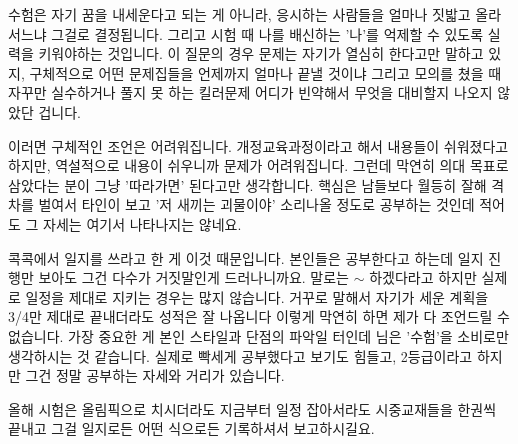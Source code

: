 수험은 자기 꿈을 내세운다고 되는 게 아니라, 응시하는 사람들을 얼마나 짓밟고 올라서느냐 그걸로 결정됩니다.
그리고 시험 때 나를 배신하는 '나'를 억제할 수 있도록 실력을 키워야하는 것입니다.
이 질문의 경우 문제는 자기가 열심히 한다고만 말하고 있지, 구체적으로 어떤 문제집들을 언제까지 얼마나 끝낼 것이냐
그리고 모의를 쳤을 때 자꾸만 실수하거나 풀지 못 하는 킬러문제 어디가 빈약해서 무엇을 대비할지 나오지 않았단 겁니다.
\vspace{5mm}

이러면 구체적인 조언은 어려워집니다. 개정교육과정이라고 해서 내용들이 쉬워졌다고 하지만, 역설적으로 내용이 쉬우니까 문제가 어려워집니다.
그런데 막연히 의대 목표로 삼았다는 분이 그냥 '따라가면' 된다고만 생각합니다. 핵심은 남들보다 월등히 잘해 격차를 벌여서
타인이 보고 '저 새끼는 괴물이야' 소리나올 정도로 공부하는 것인데 적어도 그 자세는 여기서 나타나지는 않네요.
\vspace{5mm}

콕콕에서 일지를 쓰라고 한 게 이것 때문입니다. 본인들은 공부한다고 하는데 일지 진행만 보아도 그건 다수가 거짓말인게 드러나니까요.
말로는 $\sim$ 하겠다라고 하지만 실제로 일정을 제대로 지키는 경우는 많지 않습니다.
거꾸로 말해서 자기가 세운 계획을 3/4만 제대로 끝내더라도 성적은 잘 나옵니다
이렇게 막연히 하면 제가 다 조언드릴 수 없습니다. 가장 중요한 게 본인 스타일과 단점의 파악일 터인데 님은 '수험'을 소비로만 생각하시는 것 같습니다.
실제로 빡세게 공부했다고 보기도 힘들고, 2등급이라고 하지만 그건 정말 공부하는 자세와 거리가 있습니다.
\vspace{5mm}

올해 시험은 올림픽으로 치시더라도 지금부터 일정 잡아서라도 시중교재들을 한권씩 끝내고 그걸 일지로든 어떤 식으로든 기록하셔서 보고하시길요.
\vspace{5mm}
